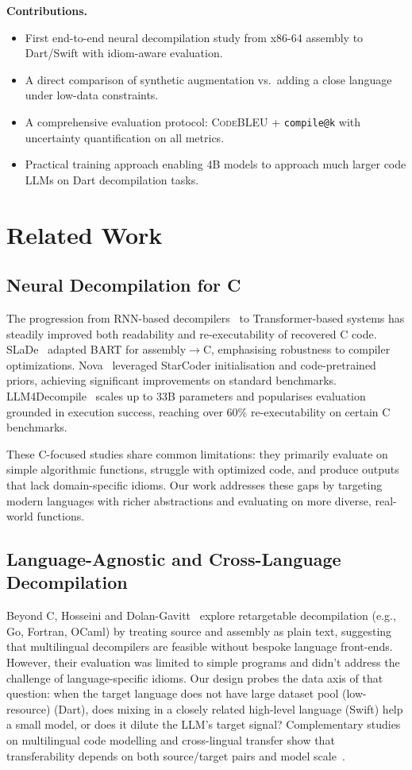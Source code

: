 \documentclass[10pt,conference]{IEEEtran}
\makeatletter
\newcommand{\codebleu}{\textsc{CodeBLEU}\xspace}
\newcommand{\compileatk}{\texttt{compile@k}\xspace}
\makeatother
\begin{document}
\textbf{Contributions.}
\begin{itemize}[leftmargin=*]
\item First end-to-end neural decompilation study from x86-64 assembly to Dart/Swift with idiom-aware evaluation.
\item A direct comparison of synthetic augmentation vs.\ adding a close language under low-data constraints.
\item A comprehensive evaluation protocol: \codebleu{} + \compileatk{} with uncertainty quantification on all metrics.
\item Practical training approach enabling 4B models to approach much larger code LLMs on Dart decompilation tasks.
\end{itemize}

\section{Related Work}

\subsection{Neural Decompilation for C}
The progression from RNN-based decompilers~\cite{katz2018} to Transformer-based systems has steadily improved both readability and re-executability of recovered C code. SLaDe~\cite{slade2024} adapted BART for assembly$\rightarrow$C, emphasising robustness to compiler optimizations. Nova~\cite{nova2023} leveraged StarCoder initialisation and code-pretrained priors, achieving significant improvements on standard benchmarks. LLM4Decompile~\cite{llm4decompile2024} scales up to 33B parameters and popularises evaluation grounded in execution success, reaching over 60\% re-executability on certain C benchmarks. 

These C-focused studies share common limitations: they primarily evaluate on simple algorithmic functions, struggle with optimized code, and produce outputs that lack domain-specific idioms. Our work addresses these gaps by targeting modern languages with richer abstractions and evaluating on more diverse, real-world functions.

\subsection{Language-Agnostic and Cross-Language Decompilation}
Beyond C,  Hosseini and Dolan-Gavitt~\cite{hosseini2022} explore retargetable decompilation (e.g., Go, Fortran, OCaml) by treating source and assembly as plain text, suggesting that multilingual decompilers are feasible without bespoke language front-ends. However, their evaluation was limited to simple programs and didn't address the challenge of language-specific idioms. Our design probes the data axis of that question: when the target language does not have large dataset pool (low-resource) (Dart), does mixing in a closely related high-level language (Swift) help a small model, or does it dilute the LLM's target signal? Complementary studies on multilingual code modelling and cross-lingual transfer show that transferability depends on both source/target pairs and model scale~\cite{multilingual2023,crosslingual2025}.
\end{document}
